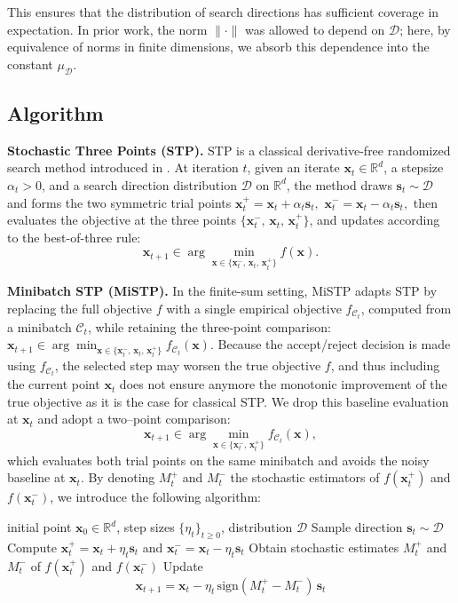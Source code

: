 \documentclass[twoside]{article}
\theoremstyle{plain}
\theoremstyle{definition}
\theoremstyle{remark}
\def\vs{{\bm{s}}}
\def\vx{{\bm{x}}}
\begin{document}
This ensures that the distribution of search directions has sufficient coverage 
in expectation. In prior work, the norm $\|\cdot\|$ was allowed to depend on $\mathcal{D}$; 
here, by equivalence of norms in finite dimensions, we absorb this dependence 
into the constant $\mu_{\mathcal{D}}$.

\subsection{Algorithm}
\textbf{Stochastic Three Points (STP).}
STP is a classical derivative-free randomized search method introduced in \cite{bergou2020stochastic}.
At iteration $t$, given an iterate $\vx_t\in\mathbb{R}^d$, a stepsize $\alpha_t>0$, and a search direction distribution $\mathcal{D}$ on $\mathbb{R}^d$, the method draws $\vs_t\sim\mathcal{D}$ and forms the two symmetric trial points
$
\vx_t^{+} = \vx_t + \alpha_t \vs_t, \,\,
\vx_t^{-} = \vx_t - \alpha_t \vs_t,
$
then evaluates the objective at the three points $\{\vx_t^{-},\,\vx_t,\,\vx_t^{+}\}$, and updates according to the best-of-three rule:
\[
\vx_{t+1} \in \arg\min_{\vx \in \{\vx_t^{-},\,\vx_t,\,\vx_t^{+}\}} f(\vx).
\]

\textbf{Minibatch STP (MiSTP).}
In the finite-sum setting, MiSTP \cite{boucherouite2024mistp} adapts STP by replacing the full objective $f$ with a single empirical objective $f_{\mathcal{C}_t}$, computed from a minibatch $\mathcal{C}_t$, while retaining the three-point comparison:
$
\vx_{t+1} \in \arg\min_{\vx \in \{\vx_t^{-},\,\vx_t,\,\vx_t^{+}\}} f_{\mathcal{C}_t}(\vx).$
Because the accept/reject decision is made using $f_{\mathcal C_t}$, the selected step may worsen the true objective $f$, and thus including the current point $\vx_t$ does not ensure anymore the monotonic improvement of the true objective as it is the case for classical STP. We drop this baseline evaluation at $\vx_t$ and adopt a two–point comparison: 
\[
\vx_{t+1} \in \arg\min_{\vx \in \{\vx_t^{-},\,\vx_t^{+}\}} f_{\mathcal C_t}(\vx),
\]
which evaluates both trial points on the same minibatch and avoids the noisy baseline at $\vx_t$. By denoting $M_t^+$ and $M_t^-$ the stochastic estimators of $f(\vx_t^+)$ and $f(\vx_t^-)$, we introduce the following algorithm: 

\begin{algorithm}[ht]
\caption{Stochastic Random Search (general form)}
\label{alg:srs}
\begin{algorithmic}[1]
\Require initial point $\vx_0 \in \mathbb{R}^d$, 
         step sizes $\{\eta_t\}_{t \geq 0}$, distribution $\mathcal{D}$
    \State Sample direction $\vs_t \sim \mathcal{D}$
    \State Compute $\vx_t^+ = \vx_t + \eta_t \vs_t$ and 
           $\vx_t^- = \vx_t - \eta_t \vs_t$
    \State Obtain stochastic estimates $M_t^+$ and $M_t^-$ 
           of $f(\vx_t^+)$ and $f(\vx_t^-)$
    \State Update
    \[
        \vx_{t+1} = \vx_t - \eta_t \, 
        \mathrm{sign}(M_t^+ - M_t^-) \, \vs_t
    \]
\EndFor
\end{algorithmic}
\end{algorithm}
\end{document}
